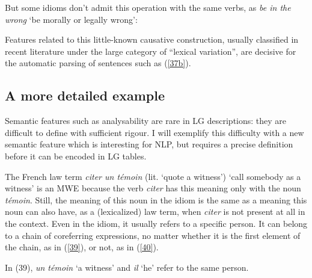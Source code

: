 \documentclass[output=paper]{langsci/langscibook}
\begin{document}
\noindent But some idioms don’t admit this operation with the same verbs, as \textit{be in the wrong} ‘be morally or legally wrong’:

 \begin{exe}
\ex \label{38} 
\begin{xlist}
\end{xlist}
\end{exe}
       

\noindent Features related to this little-known causative construction, usually classified in recent literature under the large category of “lexical variation”, are decisive for the automatic parsing of sentences such as (\ref{37b}).

\subsection{A more detailed example} 

Semantic features such as analysability are rare in LG descriptions: they are difficult to define with sufficient rigour. I will exemplify this difficulty with a new semantic feature which is interesting for  NLP, but requires a precise definition before it can be encoded in LG tables. 

The French law term \textit{citer un témoin} (lit. `quote a witness') ‘call somebody as a witness’ is an MWE because the verb \textit{citer} has this meaning only with the noun \textit{témoin}. Still, the meaning of this noun in the idiom is the same as a meaning this noun can also have, as a (lexicalized) law term, when \textit{citer} is not present at all in the context. Even in the idiom, it usually refers to a specific person. It can belong to a chain of coreferring expressions, no matter whether it is the first element of the chain, as in (\ref{39}), or not, as in (\ref{40}).


\begin{exe}
\end{exe}

\noindent In (39), \textit{un témoin} ‘a witness’ and \textit{il} ‘he’ refer to the same person.
\end{document}

